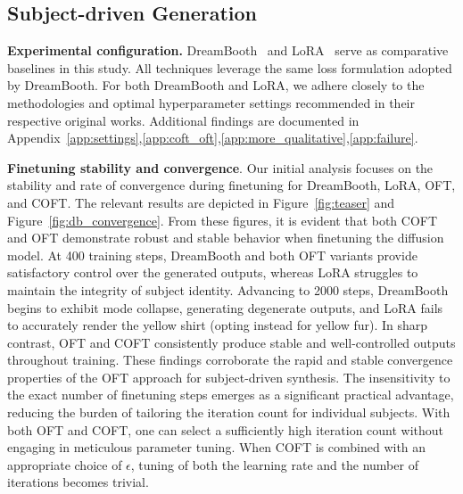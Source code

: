 \subsection{Subject-driven Generation}

\textbf{Experimental configuration.} DreamBooth~\cite{ruiz2023dreambooth} and LoRA~\cite{hulora2022} serve as comparative baselines in this study. All techniques leverage the same loss formulation adopted by DreamBooth. For both DreamBooth and LoRA, we adhere closely to the methodologies and optimal hyperparameter settings recommended in their respective original works. Additional findings are documented in Appendix~\ref{app:settings},\ref{app:coft_oft},\ref{app:more_qualitative},\ref{app:failure}.

\textbf{Finetuning stability and convergence}. Our initial analysis focuses on the stability and rate of convergence during finetuning for DreamBooth, LoRA, OFT, and COFT. The relevant results are depicted in Figure~\ref{fig:teaser} and Figure~\ref{fig:db_convergence}. From these figures, it is evident that both COFT and OFT demonstrate robust and stable behavior when finetuning the diffusion model. At 400 training steps, DreamBooth and both OFT variants provide satisfactory control over the generated outputs, whereas LoRA struggles to maintain the integrity of subject identity. Advancing to 2000 steps, DreamBooth begins to exhibit mode collapse, generating degenerate outputs, and LoRA fails to accurately render the yellow shirt (opting instead for yellow fur). In sharp contrast, OFT and COFT consistently produce stable and well-controlled outputs throughout training. These findings corroborate the rapid and stable convergence properties of the OFT approach for subject-driven synthesis. The insensitivity to the exact number of finetuning steps emerges as a significant practical advantage, reducing the burden of tailoring the iteration count for individual subjects. With both OFT and COFT, one can select a sufficiently high iteration count without engaging in meticulous parameter tuning. When COFT is combined with an appropriate choice of $\epsilon$, tuning of both the learning rate and the number of iterations becomes trivial.

